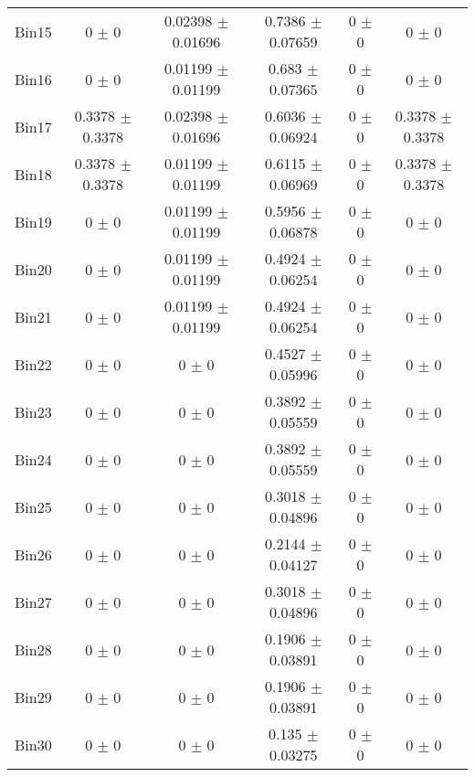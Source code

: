 \begin{tabular}{@{\extracolsep{4pt}}lccccc@{}}
     Bin15 & 0 $\pm$ 0 & 0.02398 $\pm$ 0.01696 & 0.7386 $\pm$ 0.07659 & 0 $\pm$ 0 & 0 $\pm$ 0 \\ 
     Bin16 & 0 $\pm$ 0 & 0.01199 $\pm$ 0.01199 & 0.683 $\pm$ 0.07365 & 0 $\pm$ 0 & 0 $\pm$ 0 \\ 
     Bin17 & 0.3378 $\pm$ 0.3378 & 0.02398 $\pm$ 0.01696 & 0.6036 $\pm$ 0.06924 & 0 $\pm$ 0 & 0.3378 $\pm$ 0.3378 \\ 
     Bin18 & 0.3378 $\pm$ 0.3378 & 0.01199 $\pm$ 0.01199 & 0.6115 $\pm$ 0.06969 & 0 $\pm$ 0 & 0.3378 $\pm$ 0.3378 \\ 
     Bin19 & 0 $\pm$ 0 & 0.01199 $\pm$ 0.01199 & 0.5956 $\pm$ 0.06878 & 0 $\pm$ 0 & 0 $\pm$ 0 \\ 
     Bin20 & 0 $\pm$ 0 & 0.01199 $\pm$ 0.01199 & 0.4924 $\pm$ 0.06254 & 0 $\pm$ 0 & 0 $\pm$ 0 \\ 
     Bin21 & 0 $\pm$ 0 & 0.01199 $\pm$ 0.01199 & 0.4924 $\pm$ 0.06254 & 0 $\pm$ 0 & 0 $\pm$ 0 \\ 
     Bin22 & 0 $\pm$ 0 & 0 $\pm$ 0 & 0.4527 $\pm$ 0.05996 & 0 $\pm$ 0 & 0 $\pm$ 0 \\ 
     Bin23 & 0 $\pm$ 0 & 0 $\pm$ 0 & 0.3892 $\pm$ 0.05559 & 0 $\pm$ 0 & 0 $\pm$ 0 \\ 
     Bin24 & 0 $\pm$ 0 & 0 $\pm$ 0 & 0.3892 $\pm$ 0.05559 & 0 $\pm$ 0 & 0 $\pm$ 0 \\ 
     Bin25 & 0 $\pm$ 0 & 0 $\pm$ 0 & 0.3018 $\pm$ 0.04896 & 0 $\pm$ 0 & 0 $\pm$ 0 \\ 
     Bin26 & 0 $\pm$ 0 & 0 $\pm$ 0 & 0.2144 $\pm$ 0.04127 & 0 $\pm$ 0 & 0 $\pm$ 0 \\ 
     Bin27 & 0 $\pm$ 0 & 0 $\pm$ 0 & 0.3018 $\pm$ 0.04896 & 0 $\pm$ 0 & 0 $\pm$ 0 \\ 
     Bin28 & 0 $\pm$ 0 & 0 $\pm$ 0 & 0.1906 $\pm$ 0.03891 & 0 $\pm$ 0 & 0 $\pm$ 0 \\ 
     Bin29 & 0 $\pm$ 0 & 0 $\pm$ 0 & 0.1906 $\pm$ 0.03891 & 0 $\pm$ 0 & 0 $\pm$ 0 \\ 
     Bin30 & 0 $\pm$ 0 & 0 $\pm$ 0 & 0.135 $\pm$ 0.03275 & 0 $\pm$ 0 & 0 $\pm$ 0 \\ 
\hline\hline
  \end{tabular}
